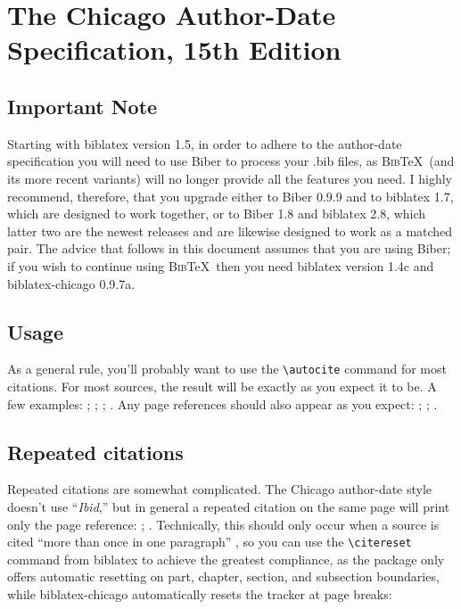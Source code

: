 \documentclass[a4paper,12pt]{report}
\newcommand{\cmd}[1]{\texttt{\textbackslash #1}}
\begin{document}
\section*{The Chicago Author-Date Specification, 15th Edition}
\label{sec:spec}

\subsection*{Important Note}
\label{bibernote}

Starting with \textsf{biblatex} version 1.5, in order to adhere to the
author-date specification you will need to use \textsf{Biber} to
process your .bib files, as \textsc{Bib}\TeX\ (and its more recent
variants) will no longer provide all the features you need.  I highly
recommend, therefore, that you upgrade either to \textsf{Biber} 0.9.9
and to \textsf{biblatex} 1.7, which are designed to work together, or
to \textsf{Biber} 1.8 and \textsf{biblatex} 2.8, which latter two are
the newest releases and are likewise designed to work as a matched
pair.  The advice that follows in this document assumes that you are
using \textsf{Biber}; if you wish to continue using \textsc{Bib}\TeX\
then you need \textsf{biblatex} version 1.4c and
\textsf{biblatex-chicago} 0.9.7a.

\subsection*{Usage}
\label{usage}

As a general rule, you'll probably want to use the \cmd{autocite}
command for most citations.  For most sources, the result will be
exactly as you expect it to be.  A few examples:
\autocite{adorno:benj}; \autocite{ashbrook:brain};
\autocite{babb:peru}; \autocite{barcott:review:15}.  Any page
references should also appear as you expect: \autocite[338]{batson};
\autocite[79]{beattie:crime}; \autocite[36]{boxer:china}.

\subsection*{Repeated citations}
\label{sec:ibidem}

Repeated citations are somewhat complicated.  The Chicago author-date
style doesn't use \enquote{\emph{Ibid},} but in general a repeated
citation on the same page will print only the page reference:
\autocite{browning:aurora}; \autocite[45]{browning:aurora}.
Technically, this should only occur when a source is cited
\enquote{more than once in one paragraph}
\autocite[16.114]{chicago:manual:15}, so you can use the
\cmd{citereset} command from \textsf{biblatex} to achieve the greatest
compliance, as the package only offers automatic resetting on part,
chapter, section, and subsection boundaries, while
\textsf{biblatex-chicago} automatically resets the tracker at page
breaks:
\end{document}
